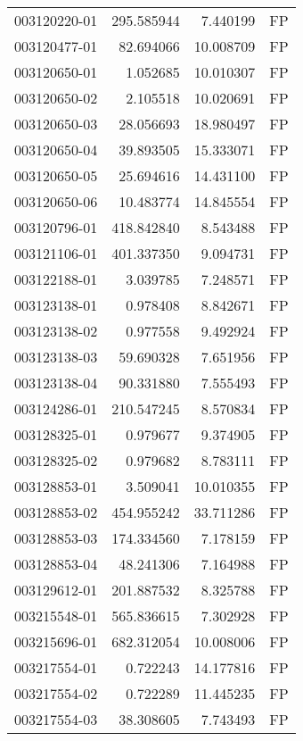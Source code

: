 \begin{tabular}{lrrl}
003120220-01 &  295.585944 &       7.440199 &   FP \\
003120477-01 &   82.694066 &      10.008709 &   FP \\
003120650-01 &    1.052685 &      10.010307 &   FP \\
003120650-02 &    2.105518 &      10.020691 &   FP \\
003120650-03 &   28.056693 &      18.980497 &   FP \\
003120650-04 &   39.893505 &      15.333071 &   FP \\
003120650-05 &   25.694616 &      14.431100 &   FP \\
003120650-06 &   10.483774 &      14.845554 &   FP \\
003120796-01 &  418.842840 &       8.543488 &   FP \\
003121106-01 &  401.337350 &       9.094731 &   FP \\
003122188-01 &    3.039785 &       7.248571 &   FP \\
003123138-01 &    0.978408 &       8.842671 &   FP \\
003123138-02 &    0.977558 &       9.492924 &   FP \\
003123138-03 &   59.690328 &       7.651956 &   FP \\
003123138-04 &   90.331880 &       7.555493 &   FP \\
003124286-01 &  210.547245 &       8.570834 &   FP \\
003128325-01 &    0.979677 &       9.374905 &   FP \\
003128325-02 &    0.979682 &       8.783111 &   FP \\
003128853-01 &    3.509041 &      10.010355 &   FP \\
003128853-02 &  454.955242 &      33.711286 &   FP \\
003128853-03 &  174.334560 &       7.178159 &   FP \\
003128853-04 &   48.241306 &       7.164988 &   FP \\
003129612-01 &  201.887532 &       8.325788 &   FP \\
003215548-01 &  565.836615 &       7.302928 &   FP \\
003215696-01 &  682.312054 &      10.008006 &   FP \\
003217554-01 &    0.722243 &      14.177816 &   FP \\
003217554-02 &    0.722289 &      11.445235 &   FP \\
003217554-03 &   38.308605 &       7.743493 &   FP \\

\end{tabular}
